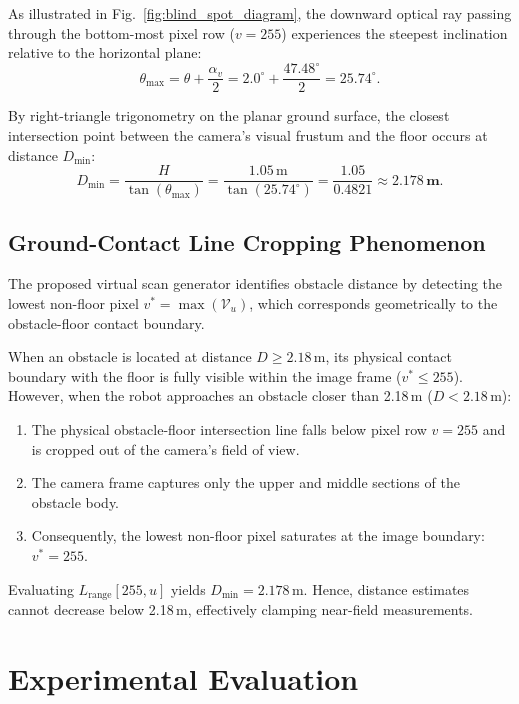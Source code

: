 \documentclass[preprint,12pt]{elsarticle}
\begin{document}
As illustrated in Fig.~\ref{fig:blind_spot_diagram}, the downward optical ray passing through the bottom-most pixel row ($v = 255$) experiences the steepest inclination relative to the horizontal plane:
\begin{equation}
  \theta_{\max} = \theta + \frac{\alpha_v}{2} = 2.0^\circ + \frac{47.48^\circ}{2} = 25.74^\circ.
\end{equation}

By right-triangle trigonometry on the planar ground surface, the closest intersection point between the camera's visual frustum and the floor occurs at distance $D_{\min}$:
\begin{equation}
  D_{\min} = \frac{H}{\tan(\theta_{\max})} = \frac{1.05\,\text{m}}{\tan(25.74^\circ)} = \frac{1.05}{0.4821} \approx \mathbf{2.178\,\text{m}}.
  \label{eq:d_min}
\end{equation}

\subsection{Ground-Contact Line Cropping Phenomenon}
The proposed virtual scan generator identifies obstacle distance by detecting the lowest non-floor pixel $v^* = \max(\mathcal{V}_u)$, which corresponds geometrically to the obstacle-floor contact boundary. 

When an obstacle is located at distance $D \ge 2.18$\,m, its physical contact boundary with the floor is fully visible within the image frame ($v^* \le 255$). However, when the robot approaches an obstacle closer than 2.18\,m ($D < 2.18$\,m):
\begin{enumerate}
  \item The physical obstacle-floor intersection line falls below pixel row $v = 255$ and is cropped out of the camera's field of view.
  \item The camera frame captures only the upper and middle sections of the obstacle body.
  \item Consequently, the lowest non-floor pixel saturates at the image boundary: $v^* = 255$.
\end{enumerate}
Evaluating $L_{\mathrm{range}}[255, u]$ yields $D_{\min} = 2.178$\,m. Hence, distance estimates cannot decrease below 2.18\,m, effectively clamping near-field measurements.

\section{Experimental Evaluation}
\label{sec:experiments}
\end{document}
